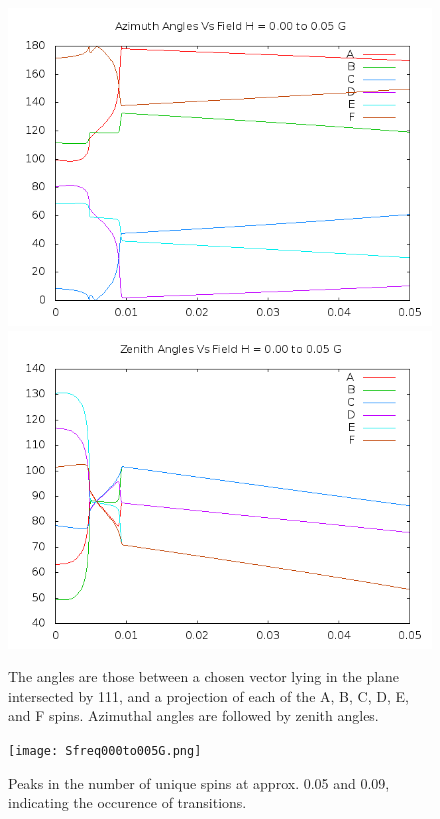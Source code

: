 \documentclass{article}
\begin{document}
\begin{figure}
\centering
\includegraphics[scale=0.5]{azim000to005.png}
\includegraphics[scale=0.5]{zen000to005.png}
\caption{The angles are those between a chosen vector lying in the plane intersected by 111,
and a projection of each of the A, B, C, D, E, and F spins. Azimuthal angles are followed by zenith angles.}
\end{figure}

\begin{center}
\vspace*{\fill}
\begin{figure}
\texttt{[image: Sfreq000to005G.png]}
\caption{Peaks in the number of unique spins at approx. 0.05 and 0.09, indicating the occurence of transitions.}
\end{figure}
\vspace*{\fill}
\end{center}
\end{document}
